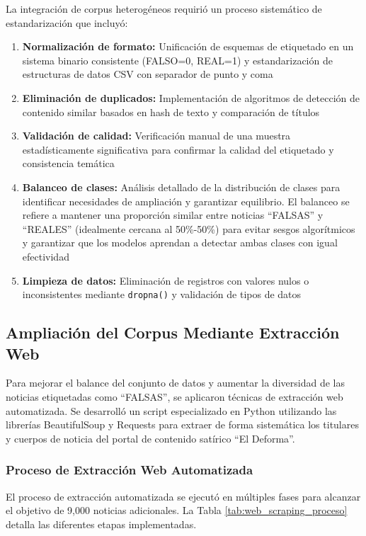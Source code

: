 La integración de corpus heterogéneos requirió un proceso sistemático de estandarización que incluyó:

\begin{enumerate}
    \item \textbf{Normalización de formato:} Unificación de esquemas de etiquetado en un sistema binario consistente (FALSO=0, REAL=1) y estandarización de estructuras de datos CSV con separador de punto y coma
    \item \textbf{Eliminación de duplicados:} Implementación de algoritmos de detección de contenido similar basados en hash de texto y comparación de títulos
    \item \textbf{Validación de calidad:} Verificación manual de una muestra estadísticamente significativa para confirmar la calidad del etiquetado y consistencia temática
    \item \textbf{Balanceo de clases:} Análisis detallado de la distribución de clases para identificar necesidades de ampliación y garantizar equilibrio. El balanceo se refiere a mantener una proporción similar entre noticias ``FALSAS'' y ``REALES'' (idealmente cercana al 50\%-50\%) para evitar sesgos algorítmicos y garantizar que los modelos aprendan a detectar ambas clases con igual efectividad
    \item \textbf{Limpieza de datos:} Eliminación de registros con valores nulos o inconsistentes mediante \texttt{dropna()} y validación de tipos de datos
\end{enumerate}

\subsection{Ampliación del Corpus Mediante Extracción Web}

Para mejorar el balance del conjunto de datos y aumentar la diversidad de las noticias etiquetadas como ``FALSAS'', se aplicaron técnicas de extracción web automatizada. Se desarrolló un script especializado en Python utilizando las librerías BeautifulSoup y Requests para extraer de forma sistemática los titulares y cuerpos de noticia del portal de contenido satírico ``El Deforma''.

\subsubsection{Proceso de Extracción Web Automatizada}

El proceso de extracción automatizada se ejecutó en múltiples fases para alcanzar el objetivo de 9,000 noticias adicionales. La Tabla \ref{tab:web_scraping_proceso} detalla las diferentes etapas implementadas.

